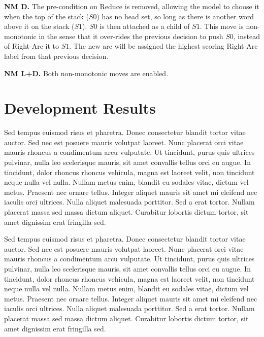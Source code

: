 \documentclass[11pt,letterpaper]{article}
\begin{document}
\textbf{NM D.} The pre-condition on Reduce is removed, allowing the model to choose it
when the top of the stack ($S0$) has no head set, so long as there is another word
above it on the stack ($S1$). $S0$ is then attached as a child of $S1$. This move
is non-monotonic in the sense that it over-rides the previous decision to push $S0$,
instead of Right-Arc it to $S1$. The new arc will be assigned the highest scoring
Right-Arc label from that previous decision.

\textbf{NM L+D.} Both non-monotonic moves are enabled. 

\section{Development Results}
\label{sec:results}

Sed tempus euismod risus et pharetra. Donec consectetur blandit tortor vitae auctor. Sed nec est posuere mauris volutpat laoreet. Nunc placerat orci vitae mauris rhoncus a condimentum arcu vulputate. Ut tincidunt, purus quis ultrices pulvinar, nulla leo scelerisque mauris, sit amet convallis tellus orci eu augue. In tincidunt, dolor rhoncus rhoncus vehicula, magna est laoreet velit, non tincidunt neque nulla vel nulla. Nullam metus enim, blandit eu sodales vitae, dictum vel metus. Praesent nec ornare tellus. Integer aliquet mauris sit amet mi eleifend nec iaculis orci ultrices. Nulla aliquet malesuada porttitor. Sed a erat tortor. Nullam placerat massa sed massa dictum aliquet. Curabitur lobortis dictum tortor, sit amet dignissim erat fringilla sed.

Sed tempus euismod risus et pharetra. Donec consectetur blandit tortor vitae auctor. Sed nec est posuere mauris volutpat laoreet. Nunc placerat orci vitae mauris rhoncus a condimentum arcu vulputate. Ut tincidunt, purus quis ultrices pulvinar, nulla leo scelerisque mauris, sit amet convallis tellus orci eu augue. In tincidunt, dolor rhoncus rhoncus vehicula, magna est laoreet velit, non tincidunt neque nulla vel nulla. Nullam metus enim, blandit eu sodales vitae, dictum vel metus. Praesent nec ornare tellus. Integer aliquet mauris sit amet mi eleifend nec iaculis orci ultrices. Nulla aliquet malesuada porttitor. Sed a erat tortor. Nullam placerat massa sed massa dictum aliquet. Curabitur lobortis dictum tortor, sit amet dignissim erat fringilla sed.
\end{document}
